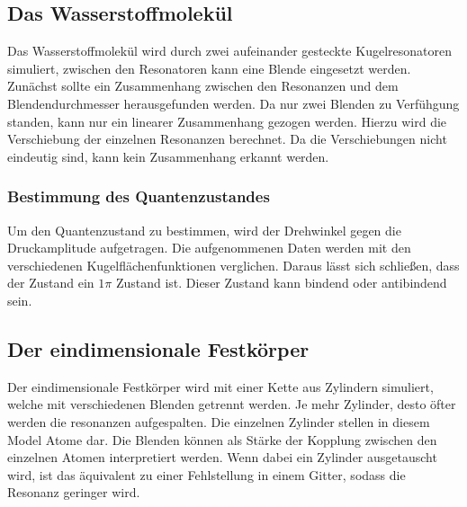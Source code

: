\subsection{Das Wasserstoffmolekül}
Das Wasserstoffmolekül wird durch zwei aufeinander gesteckte Kugelresonatoren simuliert, zwischen den Resonatoren kann eine Blende 
eingesetzt werden.
Zunächst sollte ein Zusammenhang zwischen den Resonanzen und dem Blendendurchmesser herausgefunden werden. Da nur zwei Blenden
zu Verfühgung standen, kann nur ein linearer Zusammenhang gezogen werden. Hierzu wird die Verschiebung der einzelnen 
Resonanzen berechnet. Da die Verschiebungen nicht eindeutig sind, kann kein Zusammenhang erkannt werden.
\subsubsection{Bestimmung des Quantenzustandes}
Um den Quantenzustand zu bestimmen, wird der Drehwinkel gegen die Druckamplitude aufgetragen. Die aufgenommenen Daten werden
mit den verschiedenen Kugelflächenfunktionen verglichen. Daraus lässt sich schließen, dass der Zustand ein $1\pi$ Zustand ist.
Dieser Zustand kann bindend oder antibindend sein.
\subsection{Der eindimensionale Festkörper}
Der eindimensionale Festkörper wird mit einer Kette aus Zylindern simuliert, welche mit verschiedenen Blenden getrennt werden.
Je mehr Zylinder, desto öfter werden die resonanzen aufgespalten.
Die einzelnen Zylinder stellen in diesem Model Atome dar. Die Blenden können als Stärke der Kopplung zwischen den einzelnen 
Atomen interpretiert werden.
Wenn dabei ein Zylinder ausgetauscht wird, ist das äquivalent zu einer Fehlstellung in einem Gitter, sodass die Resonanz geringer wird.